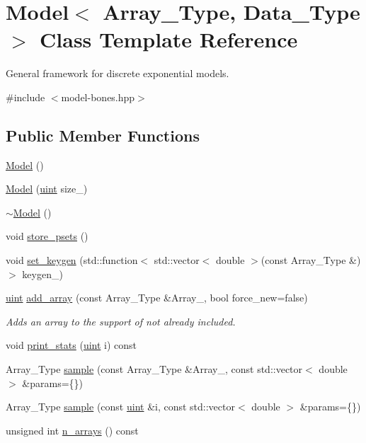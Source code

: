 \hypertarget{class_model}{}\section{Model$<$ Array\+\_\+\+Type, Data\+\_\+\+Type $>$ Class Template Reference}
\label{class_model}


General framework for discrete exponential models.  




{\ttfamily \#include $<$model-\/bones.\+hpp$>$}

\subsection*{Public Member Functions}
\begin{DoxyCompactItemize}
\item 
\hyperlink{class_model_a38122122aa4eb799b90ed1ee49b9410c}{Model} ()
\item 
\hyperlink{class_model_a841a883c666ecd9b07385bfb36078bc5}{Model} (\hyperlink{typedefs_8hpp_a91ad9478d81a7aaf2593e8d9c3d06a14}{uint} size\+\_\+)
\item 
\hyperlink{class_model_aaed0a5937479c213e620bf8095ddea5d}{$\sim$\+Model} ()
\item 
void \hyperlink{class_model_afd6d7130b41f92e5ec1984ea53c83720}{store\+\_\+psets} ()
\item 
void \hyperlink{class_model_afa4736153fa419e1f141839eda735dfe}{set\+\_\+keygen} (std\+::function$<$ std\+::vector$<$ double $>$(const Array\+\_\+\+Type \&)$>$ keygen\+\_\+)
\item 
\hyperlink{typedefs_8hpp_a91ad9478d81a7aaf2593e8d9c3d06a14}{uint} \hyperlink{class_model_a28ad7090cb5b3f3be9e24d9aef15ce75}{add\+\_\+array} (const Array\+\_\+\+Type \&Array\+\_\+, bool force\+\_\+new=false)
\begin{DoxyCompactList}\small\item\em Adds an array to the support of not already included. \end{DoxyCompactList}\item 
void \hyperlink{class_model_a1109a7cacf9993aa3189240bc41d5bec}{print\+\_\+stats} (\hyperlink{typedefs_8hpp_a91ad9478d81a7aaf2593e8d9c3d06a14}{uint} i) const
\item 
Array\+\_\+\+Type \hyperlink{class_model_aee8f9832e77a43f29b3767ae91b9a0ad}{sample} (const Array\+\_\+\+Type \&Array\+\_\+, const std\+::vector$<$ double $>$ \&params=\{\})
\item 
Array\+\_\+\+Type \hyperlink{class_model_a6cd63c3177775e07b20a64baa62daa39}{sample} (const \hyperlink{typedefs_8hpp_a91ad9478d81a7aaf2593e8d9c3d06a14}{uint} \&i, const std\+::vector$<$ double $>$ \&params=\{\})
\item 
unsigned int \hyperlink{class_model_a35678412d71c9f96aa19099c72179f3d}{n\+\_\+arrays} () const
\end{DoxyCompactItemize}
